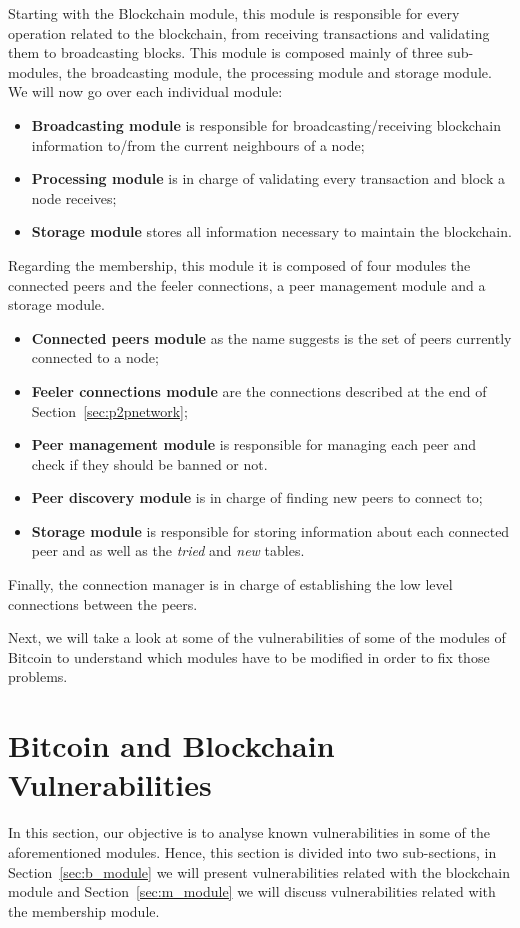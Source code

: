 Starting with the Blockchain module, this module is responsible for every operation related to the blockchain, from receiving transactions and validating them to broadcasting blocks. This module is composed mainly of three sub-modules, the broadcasting module, the processing module and storage module. We will now go over each individual module:
\begin{itemize}
    \item \textbf{Broadcasting module} is responsible for broadcasting/receiving blockchain information to/from the current neighbours of a node;
    \item \textbf{Processing module} is in charge of validating every transaction and block a node receives;
    \item \textbf{Storage module} stores all information necessary to maintain the blockchain.
\end{itemize}

Regarding the membership, this module it is composed of four modules the connected peers and the feeler connections, a peer management module and a storage module.
\begin{itemize}
    \item \textbf{Connected peers module} as the name suggests is the set of peers currently connected to a node;
    \item \textbf{Feeler connections module} are the connections described at the end of Section~\ref{sec:p2pnetwork};
    \item \textbf{Peer management module} is responsible for managing each peer and check if they should be banned or not.
    \item \textbf{Peer discovery module} is in charge of finding new peers to connect to;
    \item \textbf{Storage module} is responsible for storing information about each connected peer and as well as the \emph{tried} and \emph{new} tables.
\end{itemize} 

Finally, the connection manager is in charge of establishing the low level connections between the peers.

Next, we will take a look at some of the vulnerabilities of some of the modules of Bitcoin to understand which modules have to be modified in order to fix those problems.


\section{Bitcoin and Blockchain Vulnerabilities}
\label{sec:vulnerabilities}
In this section, our objective is to analyse known vulnerabilities in some of the aforementioned modules. Hence, this section is divided into two sub-sections, in Section~\ref{sec:b_module} we will present vulnerabilities related with the blockchain module and Section~\ref{sec:m_module} we will discuss vulnerabilities related with the membership module.

